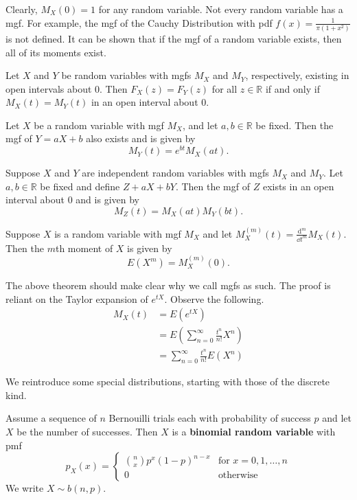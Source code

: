 Clearly, $M_X(0)=1$ for any random variable. Not every random variable has a mgf. For example, the mgf of the Cauchy Distribution with pdf $f(x)=\frac{1}{\pi(1+x^2)}$ is not defined. It can be shown that if the mgf of a random variable exists, then all of its moments exist.

\begin{theorem}[]
	Let $X$ and $Y$ be random variables with mgfs $M_X$ and $M_Y$, respectively, existing in open intervals about 0. Then $F_X(z)=F_Y(z)$ for all $z\in\mathbb R$ if and only if $M_X(t)=M_Y(t)$ in an open interval about 0.
\end{theorem}

\begin{theorem}[]
	Let $X$ be a random variable with mgf $M_X$, and let $a,b\in\mathbb R$ be fixed. Then the mgf of $Y=aX+b$ also exists and is given by $$M_Y(t)=e^{bt}M_X(at).$$
\end{theorem}

\begin{theorem}[]
	Suppose $X$ and $Y$ are independent random variables with mgfs $M_X$ and $M_Y$. Let $a,b\in\mathbb R$ be fixed and define $Z+aX+bY$. Then the mgf of $Z$ exists in an open interval about 0 and is given by
	$$M_Z(t)=M_X(at)M_Y(bt).$$
\end{theorem}

\begin{theorem}[]
	Suppose $X$ is a random variable with mgf $M_X$ and let $M_X^{(m)}(t)=\frac{\mathrm{d}^m}{\dd t^m}M_X(t)$. Then the $m$th moment of $X$ is given by $$E(X^m)=M_X^{(m)}(0).$$
\end{theorem}

The above theorem should make clear why we call mgfs as such. The proof is reliant on the Taylor expansion of $e^{tX}$. Observe the following.
\begin{align*}
	M_X(t)&=E(e^{tX})\\
	&=E\left(\sum_{n=0}^\infty \frac{t^n}{n!}X^n\right)\\
	&=\sum_{n=0}^\infty \frac{t^n}{n!}E(X^n)
\end{align*}

We reintroduce some special distributions, starting with those of the discrete kind.

\begin{definition}
	Assume a sequence of $n$ Bernouilli trials each with probability of success $p$ and let $X$ be the number of successes. Then $X$ is a \textbf{binomial random variable} with pmf $$p_X(x)=\begin{cases}
		\binom{n}{x}p^x(1-p)^{n-x} & \text{for $x=0,1,\hdots,n$}\\
		0 & \text{otherwise}
	\end{cases}$$
	We write $X\sim b(n,p)$.
\end{definition}

